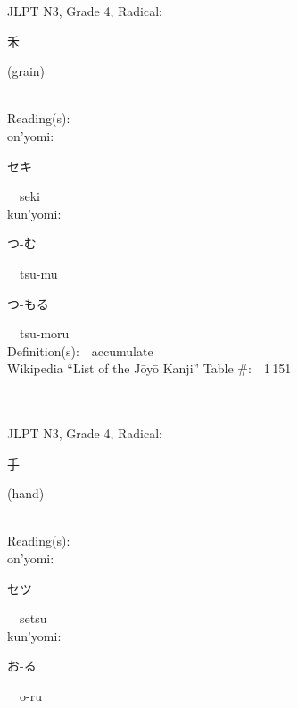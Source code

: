 \begin{multicols}{2}
{JLPT N3, Grade 4, Radical:\ \ {\begin{CJK}{UTF8}{min} 禾 \end{CJK}} (grain) } \\
Reading(s):\ \ \\
{\hspace*{1em}}on'yomi:\ \ \\
{\hspace*{2em}}{\begin{CJK}{UTF8}{min} セキ \end{CJK}}\ \ seki\ \ \\
{\hspace*{1em}}kun'yomi:\ \ \\
{\hspace*{2em}}{\begin{CJK}{UTF8}{min} つ-む \end{CJK}}\ \ tsu-mu\ \ \\
{\hspace*{2em}}{\begin{CJK}{UTF8}{min} つ-もる \end{CJK}}\ \ tsu-moru\ \ \\
Definition(s):\ \ accumulate \\
Wikipedia ``List of the J\=oy\=o Kanji'' Table \#:\ \ 1\,151 \\
\ \ \\
{\fontsize{34pt}{40pt}  }\ \ \\  %
{JLPT N3, Grade 4, Radical:\ \ {\begin{CJK}{UTF8}{min} 手 \end{CJK}} (hand) } \\
Reading(s):\ \ \\
{\hspace*{1em}}on'yomi:\ \ \\
{\hspace*{2em}}{\begin{CJK}{UTF8}{min} セツ \end{CJK}}\ \ setsu\ \ \\
{\hspace*{1em}}kun'yomi:\ \ \\
{\hspace*{2em}}{\begin{CJK}{UTF8}{min} お-る \end{CJK}}\ \ o-ru\ \ \\

\end{multicols}
